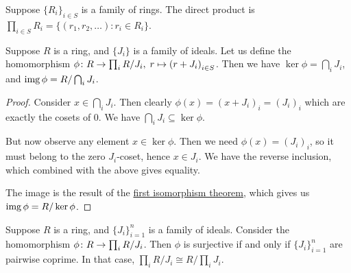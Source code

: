 \begin{definition}
    Suppose \({\{R_i\}}_{i \in S}\) is a family of rings.
    The direct product is \(\prod_{i \in S} R_i = \{(r_1,r_2,\hdots) : r_i \in R_i\}\).
\end{definition}
\begin{lemma}\label{lem:ideal-projections}
    Suppose \(R\) is a ring, and \(\{J_i\}\) is a family of ideals.
    Let us define the homomorphism \(\phi\colon R\to\prod_i R/J_i,\;r\mapsto{(r+J_i)}_{i \in S}\).
    Then we have \(\ker\phi = \bigcap_i J_i\),
    and \(\operatorname{img}\phi = R/\bigcap_i J_i\).
\end{lemma}
\begin{proof}
    Consider \(x \in \bigcap_i J_i\).
    Then clearly \(\phi(x) = {(x+J_i)}_i = {(J_i)}_i\)
    which are exactly the cosets of 0.
    We have \(\bigcap_i J_i \subseteq \ker\phi\).

    But now observe any element \(x \in \ker\phi\).
    Then we need \(\phi(x) = {(J_i)}_i\),
    so it must belong to the zero \(J_i\)-coset,
    hence \(x \in J_i\).
    We have the reverse inclusion,
    which combined with the above gives equality.

    The image is the result of the
    \hyperref[thm:iso-1-mod]{first isomorphism theorem},
    which gives us \(\operatorname{img}\phi = R/\ker\phi\).
\end{proof}
\begin{theorem}\label{thm:chinese}
    Suppose \(R\) is a ring, and \({\{J_i\}}_{i=1}^n\) is a family of ideals.
    Consider the homomorphism \(\phi\colon R\to\prod_i R/J_i\).
    Then \(\phi\) is surjective if and only if \({\{J_i\}}_{i=1}^n\) are pairwise coprime.
    In that case, \(\prod_i R/J_i \cong R/\prod_i J_i\).
\end{theorem}
